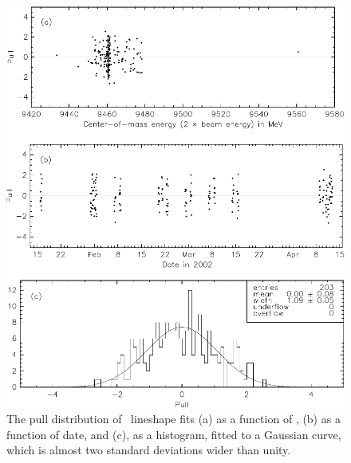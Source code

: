 \documentclass{cornell}
\begin{document}
\begin{figure}[p]
  \begin{center}
    \includegraphics[width=\linewidth]{plots/pullsone}
  \end{center}
  \caption[Pull distributions for \us]{\label{pullsone} The pull distribution of \us\ lineshape
  fits (a) as a function of \ecm, (b) as a function of date, and (c),
  as a histogram, fitted to a Gaussian curve, which is almost two
  standard deviations wider than unity.}
\end{figure}
\end{document}
